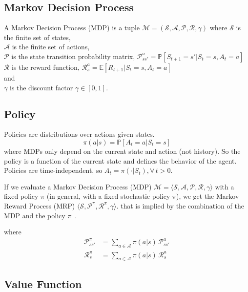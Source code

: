 \begin{itemize}
\section{Markov Decision Process}\label{sec:markov-decision-process2}
\begin{definition}
    A Markov Decision Process (MDP) is a tuple $\mathcal{M}=(\mathcal{S},\mathcal{A},\mathcal{P},\mathcal{R},\gamma)$
    where
    $\mathcal{S}$ is the finite set of states, \\
    $\mathcal{A}$ is the finite set of actions, \\
    $\mathcal{P}$ is the state transition probability matrix,
    $\mathcal{P}_{ss'}^{a}=\mathbb{P}[S_{t+1}=s'|S_t=s,A_t=a]$\\
    $\mathcal{R}$ is the reward function, $\mathcal{R}_{s}^{a}=\mathbb{E}[R_{t+1}|S_t=s,A_t=a]$ \\
    and  \\
    $\gamma$ is the discount factor $\gamma\in[0,1]$. \\
\end{definition} %

\subsection{Policy}\label{subsec:policy}
Policies are distributions over actions given states.
\[
    \pi(a|s) = \mathbb{P}[A_t=a|S_t=s]
\]
where MDPs only depend on the current state and action (not history).
So the policy is a function of the current state and defines
the behavior of the agent.
Policies are time-independent, so $A_t=\pi(\cdot|S_t),\forall\,t>0$.


If we evaluate a Markov Decision Process (MDP)
$\mathcal{M}=\langle\mathcal{S},\mathcal{A},\mathcal{P},\mathcal{R},\gamma\rangle$
with a fixed policy $\pi$ (in general, with a fixed stochastic policy $\pi$), we get the
Markov Reward Process (MRP) $\langle \mathcal{S},\mathcal{P}^{\pi},\mathcal{R}^{\pi},\gamma\rangle$.
that is implied by the combination of the MDP and the
policy $\pi$~\cite[100]{rao-2022}.

where
\begin{align}
    \mathcal{P}^{\pi}_{ss'} &= \sum_{a\in\mathcal{A}}^{}\pi(a|s)\,\mathcal{P}_{ss'}^{a} \\
    \mathcal{R}^{\pi}_{s} &= \sum_{a\in\mathcal{A}}^{}\pi(a|s)\,\mathcal{R}_{s}^{a}
\end{align}

\subsection{Value Function}\label{subsec:value-function}


\end{itemize}
